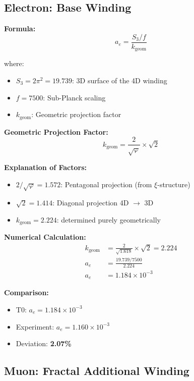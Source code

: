 	\subsection{Electron: Base Winding}
	
	\textbf{Formula:}
	\begin{equation}
		a_e = \frac{S_3/f}{k_{\text{geom}}}
		\label{eq:ae}
	\end{equation}
	
	where:
	\begin{itemize}
		\item $S_3 = 2\pi^2 = 19.739$: 3D surface of the 4D winding
		\item $f = 7500$: Sub-Planck scaling
		\item $k_{\text{geom}}$: Geometric projection factor
	\end{itemize}
	
	\textbf{Geometric Projection Factor:}
	\begin{equation}
		k_{\text{geom}} = \frac{2}{\sqrt{\varphi}} \times \sqrt{2}
		\label{eq:kgeom}
	\end{equation}
	
	\textbf{Explanation of Factors:}
	\begin{itemize}
		\item $2/\sqrt{\varphi} = 1.572$: Pentagonal projection (from $\xi$-structure)
		\item $\sqrt{2} = 1.414$: Diagonal projection 4D $\to$ 3D
		\item $k_{\text{geom}} = 2.224$: determined purely geometrically
	\end{itemize}
	
	\textbf{Numerical Calculation:}
	\begin{align}
		k_{\text{geom}} &= \frac{2}{\sqrt{1.618}} \times \sqrt{2} = 2.224 \\
		a_e &= \frac{19.739 / 7500}{2.224} \\
		a_e &= 1.184 \times 10^{-3}
	\end{align}
	
	\textbf{Comparison:}
	\begin{itemize}
		\item T0: $a_e = 1.184 \times 10^{-3}$
		\item Experiment: $a_e = 1.160 \times 10^{-3}$
		\item Deviation: \textbf{2.07\%}
	\end{itemize}
	
	\subsection{Muon: Fractal Additional Winding}
	
